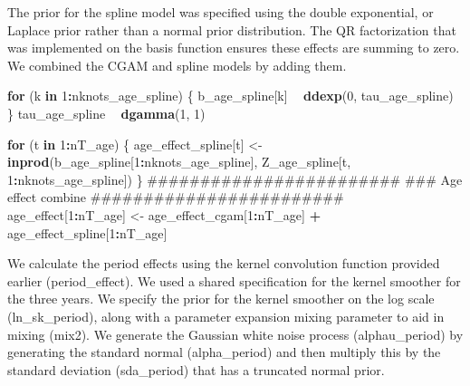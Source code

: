 \documentclass[11pt,]{article}
\newenvironment{Shaded}{\begin{snugshade}}{\end{snugshade}}
\newcommand{\KeywordTok}[1]{\textcolor[rgb]{0.13,0.29,0.53}{\textbf{#1}}}
\newcommand{\DecValTok}[1]{\textcolor[rgb]{0.00,0.00,0.81}{#1}}
\newcommand{\StringTok}[1]{\textcolor[rgb]{0.31,0.60,0.02}{#1}}
\newcommand{\ControlFlowTok}[1]{\textcolor[rgb]{0.13,0.29,0.53}{\textbf{#1}}}
\newcommand{\OperatorTok}[1]{\textcolor[rgb]{0.81,0.36,0.00}{\textbf{#1}}}
\newcommand{\NormalTok}[1]{#1}
\begin{document}
The prior for the spline model was specified using the double
exponential, or Laplace prior rather than a normal prior distribution.
The QR factorization that was implemented on the basis function ensures
these effects are summing to zero. We combined the CGAM and spline
models by adding them.

\begin{Shaded}
\begin{Highlighting}[]
  \ControlFlowTok{for}\NormalTok{ (k }\ControlFlowTok{in} \DecValTok{1}\OperatorTok{:}\NormalTok{nknots_age_spline) \{}
\NormalTok{    b_age_spline[k] }\OperatorTok{~}\StringTok{ }\KeywordTok{ddexp}\NormalTok{(}\DecValTok{0}\NormalTok{, tau_age_spline)}
\NormalTok{  \}}
\NormalTok{  tau_age_spline }\OperatorTok{~}\StringTok{ }\KeywordTok{dgamma}\NormalTok{(}\DecValTok{1}\NormalTok{, }\DecValTok{1}\NormalTok{)}

  \ControlFlowTok{for}\NormalTok{ (t }\ControlFlowTok{in} \DecValTok{1}\OperatorTok{:}\NormalTok{nT_age) \{}
\NormalTok{      age_effect_spline[t] <-}\StringTok{ }\KeywordTok{inprod}\NormalTok{(b_age_spline[}\DecValTok{1}\OperatorTok{:}\NormalTok{nknots_age_spline],}
\NormalTok{                                     Z_age_spline[t, }\DecValTok{1}\OperatorTok{:}\NormalTok{nknots_age_spline])}
\NormalTok{  \}}
\NormalTok{  ########################}
\NormalTok{  ### Age effect combine}
\NormalTok{  ########################}
\NormalTok{  age_effect[}\DecValTok{1}\OperatorTok{:}\NormalTok{nT_age] <-}\StringTok{ }\NormalTok{age_effect_cgam[}\DecValTok{1}\OperatorTok{:}\NormalTok{nT_age] }\OperatorTok{+}
\StringTok{                          }\NormalTok{age_effect_spline[}\DecValTok{1}\OperatorTok{:}\NormalTok{nT_age]}
\end{Highlighting}
\end{Shaded}

We calculate the period effects using the kernel convolution function
provided earlier (period\_effect). We used a shared specification for
the kernel smoother for the three years. We specify the prior for the
kernel smoother on the log scale (ln\_sk\_period), along with a
parameter expansion mixing parameter to aid in mixing (mix2). We
generate the Gaussian white noise process (alphau\_period) by generating
the standard normal (alpha\_period) and then multiply this by the
standard deviation (sda\_period) that has a truncated normal prior.
\end{document}

